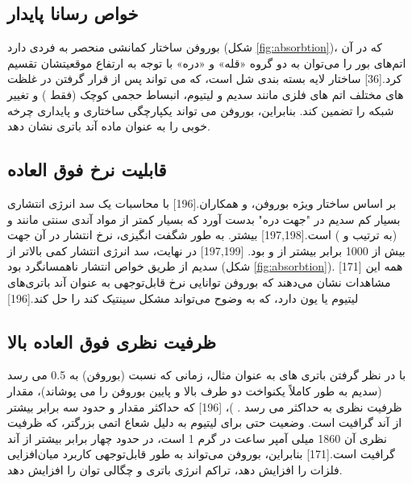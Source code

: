\subsection{خواص رسانا پایدار}
بوروفن  ساختار کمانشی منحصر به فردی دارد (شکل \ref{fig:absorbtion})، که در آن اتم‌های بور را می‌توان به دو گروه «قله» و «دره» با توجه به ارتفاع موقعیتشان تقسیم کرد.\cite{mannixSynthesisBorophenesAnisotropic2015}[36] ساختار لایه بسته بندی شل است، که می تواند پس از قرار گرفتن در غلظت های مختلف اتم های فلزی مانند سدیم و لیتیوم، انبساط حجمی کوچک (فقط ) و تغییر شبکه را تضمین کند. بنابراین، بوروفن می تواند یکپارچگی ساختاری و پایداری چرخه خوبی را به عنوان ماده آند باتری نشان دهد.
\subsection{قابلیت نرخ فوق العاده}
بر اساس ساختار ویژه بوروفن،  و همکاران.\cite{shiInitioPredictionBorophene2016}[196] با محاسبات  یک سد انرژی انتشاری بسیار کم  سدیم در "جهت دره" بدست آورد که بسیار کمتر از مواد آندی سنتی مانند  و  (به ترتیب  و ) است.[197,198] بیشتر. به طور شگفت انگیزی، نرخ انتشار در آن جهت بیش از 1000 برابر بیشتر از  و  بود. \cite{baggettoIntrinsicThermodynamicKinetic2013, gonzeFirstprinciplesComputationMaterial2002, panSodiumStorageTransport2013}[197,199] در نهایت، سد انرژی انتشار  کمی بالاتر از سدیم از طریق خواص انتشار ناهمسانگرد بود (شکل \ref{fig:absorbtion}). [171] همه این مشاهدات نشان می‌دهند که بوروفن توانایی نرخ قابل‌توجهی به عنوان آند باتری‌های لیتیوم یا یون دارد، که به وضوح می‌تواند مشکل سینتیک کند را حل کند.\cite{shiInitioPredictionBorophene2016}[196]
\subsection{ظرفیت نظری فوق العاده بالا}
با در نظر گرفتن باتری های  به عنوان مثال، زمانی که نسبت  (بوروفن) به 0.5 می رسد (سدیم به طور کاملاً یکنواخت دو طرف بالا و پایین بوروفن را می پوشاند)، مقدار ظرفیت نظری به حداکثر می رسد . )، \cite{shiInitioPredictionBorophene2016}[196] که حداکثر مقدار و حدود سه برابر بیشتر از آند گرافیت  است. وضعیت حتی برای لیتیوم  به دلیل شعاع اتمی بزرگتر، که ظرفیت نظری آن 1860 میلی آمپر ساعت در گرم 1 است، در حدود چهار برابر بیشتر از آند گرافیت است.\cite{jiangBorophenePromisingAnode2016}[171] بنابراین، بوروفن می‌تواند به طور قابل‌توجهی کاربرد میان‌افزایی فلزات را افزایش دهد، تراکم انرژی باتری و چگالی توان را افزایش دهد.


